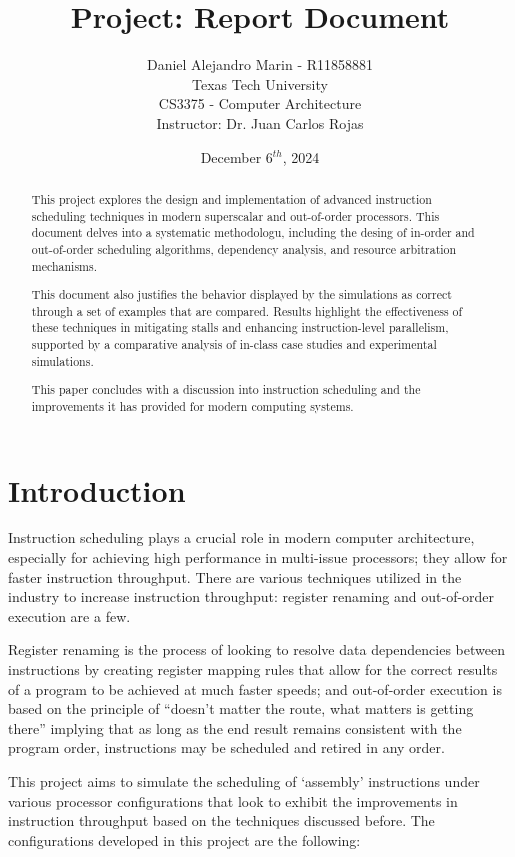 \documentclass{article}
\title{Project: Report Document}
\author{Daniel Alejandro Marin - R11858881\\
    \small Texas Tech University \\
    \small CS3375 - Computer Architecture \\ 
    \small Instructor: Dr. Juan Carlos Rojas}
\date{December 6$^{th}$, 2024}
\begin{document}
\maketitle
\begin{abstract}
    This project explores the design and implementation of advanced instruction scheduling techniques in modern superscalar and out-of-order processors. This document delves into a systematic methodologu, including the desing of in-order and out-of-order scheduling algorithms, dependency analysis, and resource arbitration mechanisms. 
    
    This document also justifies the behavior displayed by the simulations as correct through a set of examples that are compared. Results highlight the effectiveness of these techniques in mitigating stalls and enhancing instruction-level parallelism, supported by a comparative analysis of in-class case studies and experimental simulations.
    
    This paper concludes with a discussion into instruction scheduling and the improvements it has provided for modern computing systems.
\end{abstract}

\tableofcontents

\newpage

\section{Introduction}
Instruction scheduling plays a crucial role in modern computer architecture, especially for achieving high performance in multi-issue processors; they allow for faster instruction throughput. There are various techniques utilized in the industry to increase instruction throughput: register renaming and out-of-order execution are a few. 

Register renaming is the process of looking to resolve data dependencies between instructions by creating register mapping rules that allow for the correct results of a program to be achieved at much faster speeds; and out-of-order execution is based on the principle of ``doesn't matter the route, what matters is getting there'' implying that as long as the end result remains consistent with the program order, instructions may be scheduled and retired in any order. 

This project aims to simulate the scheduling of `assembly' instructions under various processor configurations that look to exhibit the improvements in instruction throughput based on the techniques discussed before. The configurations developed in this project are the following:
\end{document}
